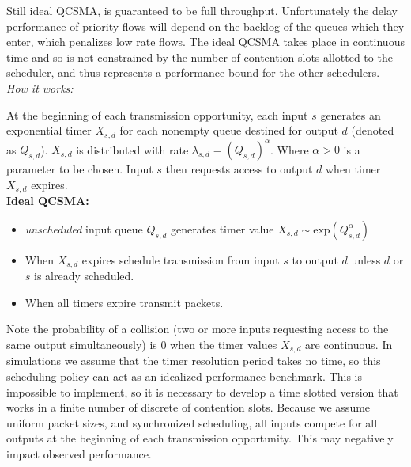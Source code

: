 \documentclass{IEEEtran}%
\begin{document}
Still ideal QCSMA, is guaranteed to be full throughput.  Unfortunately the delay performance of priority flows will depend on the backlog of the queues which they enter, which penalizes low rate flows.  The ideal QCSMA takes place in continuous time and so is not constrained by the number of contention slots allotted to the scheduler, and thus represents a performance bound for the other schedulers.\\

{\it How it works:}

At the beginning of each transmission opportunity, each input $s$ generates an exponential timer $X_{s,d}$ for each nonempty queue  destined for output $d$ (denoted as $Q_{s,d}$).  $X_{s,d}$ is distributed with rate $\lambda_{s,d} = (Q_{s,d})^{\alpha}$.  Where $\alpha > 0$ is a parameter to be chosen.  Input $s$ then requests access to output $d$ when timer $X_{s,d}$ expires. \\ %

{\bf Ideal QCSMA:}
\begin{itemize}
\item {\it unscheduled} input queue $Q_{s,d}$ generates timer value $X_{s,d}\sim \text{exp}(Q_{s,d}^\alpha)$
\item When $X_{s,d}$ expires schedule transmission from input $s$ to output $d$ unless $d$ or $s$ is already scheduled.
\item When all timers expire transmit packets.\\
\end{itemize}

Note the probability of a collision (two or more inputs requesting access to the same output simultaneously) is 0 when the timer values $X_{s,d}$ are continuous.  In simulations we assume that the timer resolution period takes no time, so this scheduling policy can act as an idealized performance benchmark.  This is impossible to implement, so it is necessary to develop a time slotted version that works in a finite number of discrete of contention slots.  Because we assume uniform packet sizes, and synchronized scheduling, all inputs compete for all outputs at the beginning of each transmission opportunity.  This may negatively impact observed performance.%
\end{document}
